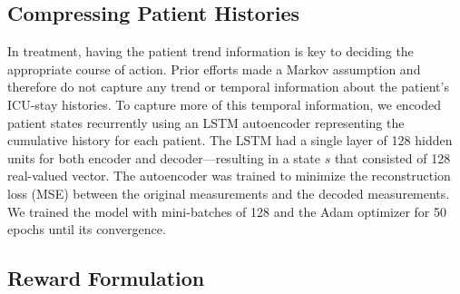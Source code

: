 \documentclass[10pt]{amia}
\begin{document}


\subsection*{Compressing Patient Histories}

In treatment, having the patient trend information is key to deciding the appropriate course of action. Prior efforts   \cite{komorowski2016markov,DBLP:journals/corr/RaghuKCSG17} made a Markov assumption and therefore do not capture any trend or temporal information about the patient's ICU-stay histories. To capture more of this temporal information, we encoded patient states recurrently using an LSTM autoencoder representing the cumulative history for each patient.  The LSTM had a single layer of 128 hidden units for both encoder and decoder---resulting in a state $s$ that consisted of 128 real-valued vector. The autoencoder was trained to minimize the reconstruction loss (MSE) between the original measurements and the decoded measurements. We trained the model with mini-batches of 128 and the Adam optimizer for 50 epochs until its convergence.


\subsection*{Reward Formulation}
\label{subsec:rewardformulation}
\end{document}
